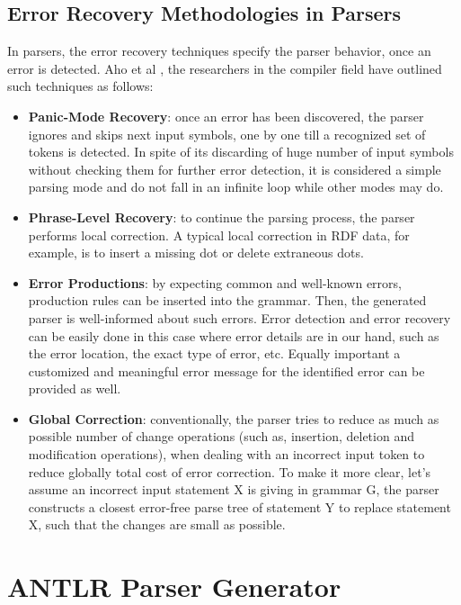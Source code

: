 \subsection{Error Recovery Methodologies in Parsers}
In parsers, the error recovery techniques specify the parser behavior, once an error is detected.  Aho et al \cite{Aho:2006}, the researchers in the compiler field    have outlined such techniques as follows:
\begin{itemize}
	\item \textbf{Panic-Mode Recovery}: once an error has been discovered, the parser ignores and skips next input symbols, one by one till a recognized set of tokens is detected. In spite of its discarding of huge number of input symbols without checking them for further error detection, it is considered a simple parsing mode and do not fall in an infinite loop while other modes may do.
	\item \textbf{Phrase-Level Recovery}: to continue the parsing process, the parser performs local correction. A typical local correction in RDF data, for example, is to insert a missing dot or delete extraneous dots.
	\item \textbf{Error Productions}: by expecting  common and well-known errors, production rules can be inserted into the grammar. Then, the generated parser is well-informed about such errors. Error detection and error recovery can be easily done in this case where error details are in our hand, such as the error location, the exact type of error, etc. Equally important a customized and meaningful error message for the identified error can be provided as well. 
	\item \textbf{Global Correction}: conventionally, the parser tries to reduce as much as possible number of change operations (such as, insertion, deletion and modification operations), when dealing with an incorrect input token to reduce globally total cost of error correction. To make it more clear, let's assume an incorrect input statement X is giving in grammar G, the parser constructs a closest error-free parse tree of statement Y to replace statement X, such that the changes are small as possible. 
\end{itemize}


\section{ANTLR Parser Generator}
\label{sec:bck_ANTLR}

